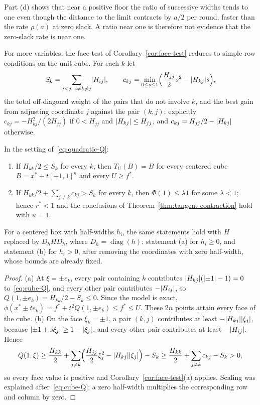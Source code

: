 Part (d) shows that near a positive floor the ratio of successive widths
tends to one even though the distance to the limit contracts by $a/2$ per
round, faster than the rate $\rho(a)$ at zero slack. A ratio near one is
therefore not evidence that the zero-slack rate is near one.

For more variables, the face test of Corollary~\ref{cor:face-test} reduces
to simple row conditions on the unit cube. For each $k$ let
\[
  S_k=\sum_{i<j,\ i\ne k\ne j}\lvert H_{ij}\rvert,\qquad
  c_{kj}=\min_{0\le s\le1}\Bigl(\frac{H_{jj}}{2}s^2-\lvert H_{kj}\rvert s\Bigr),
\]
the total off-diagonal weight of the pairs that do not involve $k$, and the
best gain from adjusting coordinate $j$ against the pair $(k,j)$; explicitly
$c_{kj}=-H_{kj}^2/(2H_{jj})$ if $0<H_{jj}$ and $\lvert H_{kj}\rvert\le H_{jj}$, and
$c_{kj}=H_{jj}/2-\lvert H_{kj}\rvert$ otherwise.

\begin{proposition}\label{prop:quadratic-rows}
In the setting of~\eqref{eq:quadratic-Q}:
\begin{enumerate}[label=(\alph*)]
\item If $H_{kk}/2\le S_k$ for every $k$, then $T_U(B)=B$ for every centered
  cube $B=x^*+t[-1,1]^n$ and every $U\ge f^*$.
\item If $H_{kk}/2+\sum_{j\ne k}c_{kj}>S_k$ for every $k$, then
  $\Phi(1)\le\lambda1$ for some $\lambda<1$; hence $r^*<1$ and the conclusions
  of Theorem~\ref{thm:tangent-contraction} hold with $u=1$.
\end{enumerate}
For a centered box with half-widths $h_i$, the same statements hold with
$H$ replaced by $D_hHD_h$, where $D_h=\operatorname{diag}(h)$: statement (a)
for $h_i\ge0$, and statement (b) for $h_i>0$, after removing the
coordinates with zero half-width, whose bounds are already fixed.
\end{proposition}

\begin{proof}
(a) At $\xi=\pm e_k$, every pair containing $k$ contributes
$\lvert H_{kj}\rvert(\lvert \pm1\rvert-1)=0$ to~\eqref{eq:cube-Q}, and every other pair
contributes $-\lvert H_{ij}\rvert$, so $Q(1,\pm e_k)=H_{kk}/2-S_k\le0$. Since the
model is exact, $\phi(x^*\pm te_k)=f^*+t^2Q(1,\pm e_k)\le f^*\le U$. These $2n$
points attain every face of the cube. (b) On the face $\xi_k=\pm1$, a pair
$(k,j)$ contributes at least $-\lvert H_{kj}\rvert\lvert \xi_j\rvert$, because
$\lvert \pm1+s\xi_j\rvert\ge1-\lvert \xi_j\rvert$, and every other pair contributes at least
$-\lvert H_{ij}\rvert$. Hence
\[
  Q(1,\xi)\ge\frac{H_{kk}}{2}
  +\sum_{j\ne k}\Bigl(\frac{H_{jj}}{2}\xi_j^2-\lvert H_{kj}\rvert\lvert \xi_j\rvert\Bigr)-S_k
  \ge\frac{H_{kk}}{2}+\sum_{j\ne k}c_{kj}-S_k>0,
\]
so every face value is positive and Corollary~\ref{cor:face-test}(a)
applies. Scaling was explained after~\eqref{eq:cube-Q}; a zero half-width
multiplies the corresponding row and column by zero.
\end{proof}

